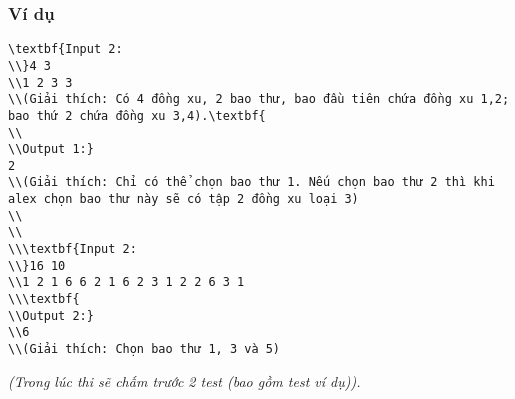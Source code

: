 \subsubsection{   Ví dụ  }
\begin{verbatim}
\textbf{Input 2:
\\}4 3
\\1 2 3 3
\\(Giải thích: Có 4 đồng xu, 2 bao thư, bao đầu tiên chứa đồng xu 1,2; bao thứ 2 chứa đồng xu 3,4).\textbf{
\\
\\Output 1:}
2
\\(Giải thích: Chỉ có thể chọn bao thư 1. Nếu chọn bao thư 2 thì khi alex chọn bao thư này sẽ có tập 2 đồng xu loại 3)
\\
\\
\\\textbf{Input 2:
\\}16 10
\\1 2 1 6 6 2 1 6 2 3 1 2 2 6 3 1
\\\textbf{
\\Output 2:}
\\6
\\(Giải thích: Chọn bao thư 1, 3 và 5)\end{verbatim}

\emph{    (Trong lúc thi sẽ chấm trước 2 test (bao gồm test ví dụ)).   }
